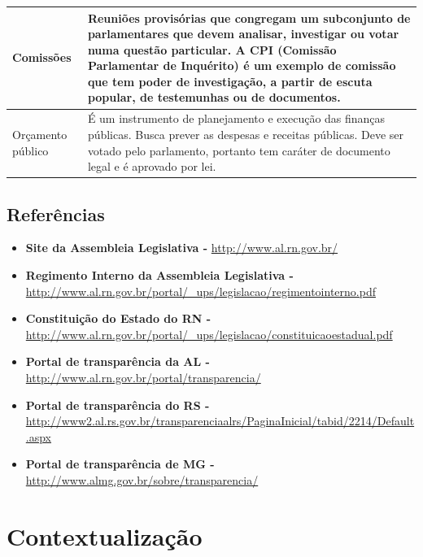 \documentclass[12pt, a4paper]{article}
\begin{document}
\begin{longtabu}{X[-1] | X}
                Comissões &
                Reuniões provisórias que congregam um subconjunto de
                parlamentares que devem analisar, investigar ou votar numa
                questão particular. A CPI (Comissão Parlamentar de Inquérito) é
                um exemplo de comissão que tem poder de investigação, a partir
                de escuta popular, de testemunhas ou de documentos.
                \\ \hline

                Orçamento público &
                É um instrumento de planejamento e execução das finanças
                públicas. Busca prever as despesas e receitas públicas. Deve
                ser votado pelo parlamento, portanto tem caráter de documento
                legal e é aprovado por lei.
                \\ \hline
            \end{longtabu}

        \subsection{Referências}
        \begin{itemize}
            \item
            \textbf{Site da Assembleia Legislativa -}
            \url{http://www.al.rn.gov.br/}
            \item
            \textbf{Regimento Interno da Assembleia Legislativa -}
            \url{http://www.al.rn.gov.br/portal/_ups/legislacao/regimentointerno.pdf}
            \item
            \textbf{Constituição do Estado do RN -}
            \url{http://www.al.rn.gov.br/portal/_ups/legislacao/constituicaoestadual.pdf}
            \item
            \textbf{Portal de transparência da AL -}
            \url{http://www.al.rn.gov.br/portal/transparencia/}
            \item
            \textbf{Portal de transparência do RS -}
            \url{http://www2.al.rs.gov.br/transparenciaalrs/PaginaInicial/tabid/2214/Default.aspx}
            \item
            \textbf{Portal de transparência de MG -}
            \url{http://www.almg.gov.br/sobre/transparencia/}
        \end{itemize}

    \section{Contextualização}
\end{document}
